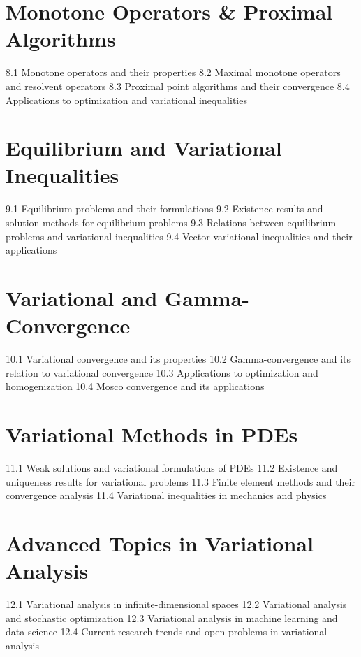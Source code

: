 \section{Monotone Operators \& Proximal Algorithms}
8.1 Monotone operators and their properties
8.2 Maximal monotone operators and resolvent operators
8.3 Proximal point algorithms and their convergence
8.4 Applications to optimization and variational inequalities
\section{Equilibrium and Variational Inequalities}
9.1 Equilibrium problems and their formulations
9.2 Existence results and solution methods for equilibrium problems
9.3 Relations between equilibrium problems and variational inequalities
9.4 Vector variational inequalities and their applications
\section{Variational and Gamma-Convergence}
10.1 Variational convergence and its properties
10.2 Gamma-convergence and its relation to variational convergence
10.3 Applications to optimization and homogenization
10.4 Mosco convergence and its applications
\section{Variational Methods in PDEs}
11.1 Weak solutions and variational formulations of PDEs
11.2 Existence and uniqueness results for variational problems
11.3 Finite element methods and their convergence analysis
11.4 Variational inequalities in mechanics and physics
\section{Advanced Topics in Variational Analysis}
12.1 Variational analysis in infinite-dimensional spaces
12.2 Variational analysis and stochastic optimization
12.3 Variational analysis in machine learning and data science
12.4 Current research trends and open problems in variational analysis
